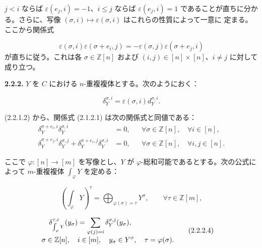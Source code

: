 \clearpage
{}%
%
$j<i$ ならば $\varepsilon(e_j,i)=-1$、$i\leq j$ ならば
$\varepsilon(e_j,i)=1$ であることが直ちに分かる。さらに、写像
$(\sigma,i)\mapsto\varepsilon(\sigma,i)$ はこれらの性質によって一意に
定まる。ここから関係式

\begin{equation}
  \varepsilon(\sigma,i)\varepsilon(\sigma+e_i,j)
  =-\varepsilon(\sigma,j)\varepsilon(\sigma+e_j,i)
  \tag{2.2.1.2}
\end{equation}
が直ちに従う。これは各 $\sigma\in\mathbb Z[n]$ および
$(i,j)\in[n]\times[n]$、$i\neq j$ に対して成り立つ。

\noindent\textbf{2.2.2.}\quad
$Y$ を $C$ における $n$-重複複体とする。次のようにおく：

\begin{equation}
  \delta_Y^{\sigma,i}=\varepsilon(\sigma,i)d_Y^{\sigma,i}.
  \tag{2.2.2.1}
\end{equation}

(2.2.1.2) から、関係式 (2.1.2.1) は次の関係式と同値である：
\begin{equation}
  \begin{aligned}
    \delta_Y^{\sigma+e_i,i}\delta_Y^{\sigma,i}
      &=0,
      &&\forall\sigma\in\mathbb Z[n],\quad\forall i\in[n],\\
    \delta_Y^{\sigma+e_j,i}\delta_Y^{\sigma,j}
      +\delta_Y^{\sigma+e_i,j}\delta_Y^{\sigma,i}
      &=0,
      &&\forall\sigma\in\mathbb Z[n],\quad\forall i,j\in[n].
  \end{aligned}
  \tag{2.2.2.2}
\end{equation}

ここで $\varphi\colon[n]\to[m]$ を写像とし、$Y$ が
$\varphi$-総和可能であるとする。次の公式によって $m$-重複複体
$\int_\varphi Y$ を定める：

\begin{equation}
  \left(\int_\varphi Y\right)^\tau
  =\bigoplus_{\varphi(\sigma)=\tau}Y^\sigma,
  \qquad \forall\tau\in\mathbb Z[m],
  \tag{2.2.2.3}
\end{equation}

\begin{equation}
  \begin{aligned}
    \delta_{\int_\varphi Y}^{\tau,i}(y_\sigma)
      &=\sum_{\varphi(j)=i}\delta_Y^{\sigma,j}(y_\sigma),\\[-1mm]
    &\hspace{-18mm}
      \sigma\in\mathbb Z[n],\quad i\in[m],\quad
      y_\sigma\in Y^\sigma,\quad\tau=\varphi(\sigma).
  \end{aligned}
  \tag{2.2.2.4}
\end{equation}

